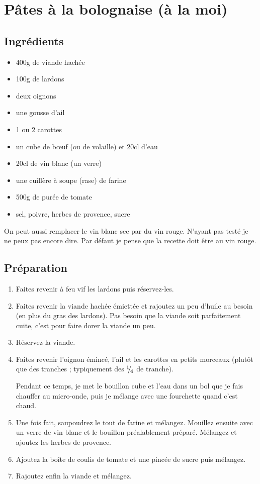 \newpage
\section{Pâtes à la bolognaise (à la moi)}
\subsection*{Ingrédients}
\begin{itemize}
\item 400g de viande hachée
\item 100g de lardons
\item deux oignons
\item une gousse d'ail
\item 1 ou 2 carottes
\item un cube de bœuf (ou de volaille) et 20cl d'eau
\item 20cl de vin blanc (un verre)
\item une cuillère à soupe (rase) de farine
\item 500g de purée de tomate
\item sel, poivre, herbes de provence, sucre
\end{itemize}

\begin{remarque}
On peut aussi remplacer le vin blanc sec par du vin rouge. N'ayant pas testé je ne peux pas encore dire. Par défaut je pense que la recette doit être au vin rouge.
\end{remarque}


\subsection*{Préparation}
\begin{enumerate}
\item Faites revenir à feu vif les lardons puis réservez-les.
\item Faites revenir la viande hachée émiettée et rajoutez un peu d'huile au besoin (en plus du gras des lardons). Pas besoin que la viande soit parfaitement cuite, c'est pour faire dorer la viande un peu.
\item Réservez la viande.
\item Faites revenir l'oignon émincé, l'ail et les carottes en petits morceaux (plutôt que des tranches ; typiquement des ${{}^{1\!\!}/ _{\!4}}$ de tranche).
\begin{remarque}
Pendant ce temps, je met le bouillon cube et l'eau dans un bol que je fais chauffer au micro-onde, puis je mélange avec une fourchette quand c'est chaud.
\end{remarque}
\item Une fois fait, saupoudrez le tout de farine et mélangez. Mouillez ensuite avec un verre de vin blanc et le bouillon préalablement préparé. Mélangez et ajoutez les herbes de provence.
\item Ajoutez la boîte de coulis de tomate et une pincée de sucre puis mélangez.
\item Rajoutez enfin la viande et mélangez.
\end{enumerate}


